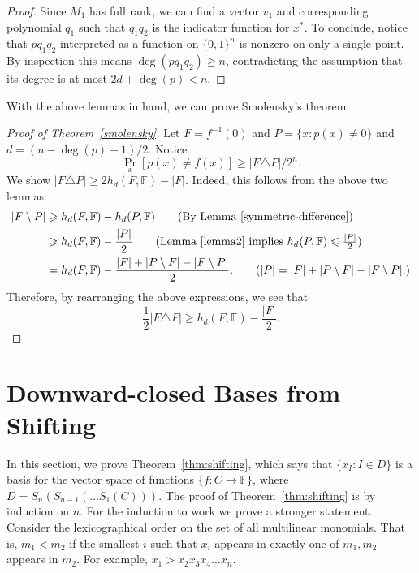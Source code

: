\documentclass[11pt]{article}
\theoremstyle{definition}
\newcommand{\1}{\mathbf{1}}
\newcommand{\F}{{\mathbb F}}
\renewcommand{\leq}{\leqslant}
\renewcommand{\geq}{\geqslant}
\newcommand{\setof}[1]{#1}
\begin{document}
\begin{appendix}
\begin{proof}
Since $M_1$ has full rank, we can find a vector $v_1$ and corresponding polynomial $q_1$ such that $q_1q_2$ is the indicator function for $x^*$.  To conclude, notice that $pq_1q_2$ interpreted as a function on $\{0,1\}^n$ is nonzero on only a single point.  By inspection this means $\deg(pq_1q_2) \geq n$, contradicting the assumption that its degree is at most $2d + \deg(p) < n$. 

\end{proof}

With the above lemmas in hand, we can prove Smolensky's theorem.  
\begin{proof}[Proof of Theorem~\ref{smolensky}]  Let $F = f^{-1}(0)$ and $P = \{x  :  p(x) \neq 0\}$ 
 and $d = (n-\deg(p)-1)/2$.  Notice \[\Pr_x[p(x) \neq f(x)] \geq |F\triangle P|/2^{n}.\]  We show $|F\triangle P| \geq 2h_d(F,\F)- |F|.$  Indeed, this follows from the above two lemmas:
\begin{align*}
|F\setminus P| &\geq h_d(F,\F)-h_d(P,\F)\tag{By Lemma~\ref{symmetric-difference}}\\
                        &\geq h_d(F,\F)-\frac{|P|}{2}\tag{Lemma~\ref{lemma2} implies $h_d(P,\F)\leq\frac{|P|}{2}$}\\
                        &= h_d(F,\F)-\frac{|F|+|P\setminus F|-|F\setminus P|}{2}.\tag{$|P| = |F|+|P\setminus F|-|F\setminus P|$.} 
\end{align*}
Therefore, by rearranging the above expressions, we see that 
$$\frac{1}{2}|F \triangle P| \geq h_d(F,\F)- \frac{|F|}{2}.$$
 \end{proof}

\section{Downward-closed Bases from Shifting}\label{app:shifting}
In this section, we prove Theorem~\ref{thm:shifting}, which says that $\{x_I : I\in \setof{D}\}$
is a basis for the vector space of functions $\{f:C\rightarrow \F\}$,  where $D=S_{n}(S_{n-1}(\ldots S_{1}(C)))$. The proof of Theorem~\ref{thm:shifting} is by induction on $n$. For the induction to work we prove a stronger statement. 
Consider the lexicographical order on the set of all multilinear monomials.
That is, $m_1 < m_2$ if the smallest $i$ such that $x_i$ appears in exactly one of $m_1,m_2$ appears in $m_2$. 
For example,
$x_1 > x_2x_3x_4\ldots x_{n}$.


\end{appendix}
\end{document}
